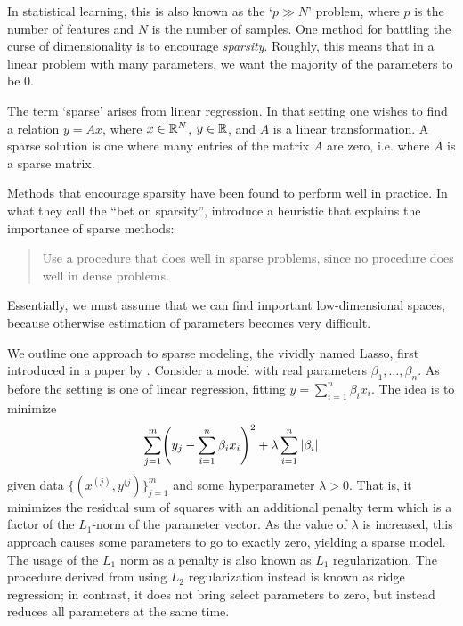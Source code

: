\documentclass[cclicense]{hmcthesis}
\numberwithin{equation}{chapter}
\numberwithin{thmcounter}{chapter}
\begin{document}
    In statistical learning, this is also known as the `$p \gg N$' problem,
    where $p$ is the number of features and $N$ is the number of samples.  One
    method for battling the curse of dimensionality is to encourage
    \emph{sparsity}.  Roughly, this means that in a linear problem with many
    parameters, we want the majority of the parameters to be $0$.  
    
    \begin{example}
        The term `sparse' arises from linear regression.  In that setting one
        wishes to find a relation $y = Ax$, where $x \in \mathbb{R}^N$, $y \in \mathbb{R}$, and
        $A$ is a linear transformation.  A sparse solution is one where many
        entries of the matrix $A$ are zero, i.e. where $A$ is a sparse matrix.
    \end{example}
    
    Methods that encourage sparsity have been found to perform well in practice.
    In what they call the ``bet on sparsity'', \citeauthor{EOSL} introduce a
    heuristic that explains the importance of sparse methods:
    \begin{quote}
        Use a procedure that does well in sparse problems, since no procedure
        does well in dense problems.
    \end{quote}
    \noindent Essentially, we must assume that we can find important
    low-dimensional spaces, because otherwise estimation of parameters becomes
    very difficult.

    We outline one approach to sparse modeling, the vividly named Lasso, first
    introduced in a paper by \citet{LASSO}.  Consider a model with real
    parameters $\beta_1, \ldots, \beta_n$.  As before the setting is one of
    linear regression, fitting $y = \sum_{i=1}^n \beta_i x_i$.  The idea is to
    minimize
    \[
        \sum_{j=1}^m \pdel*{y_j - \sum_{i=1}^n \beta_i x_i}^2 + \lambda \sum_{i=1}^n
        |\beta_i|
    \]
    given data $\{(x^{(j)}, y^{(j})\}_{j=1}^m$ and some hyperparameter $\lambda
    > 0$.  That is, it minimizes the residual sum of squares with an additional
    penalty term which is a factor of the $L_1$-norm of the parameter vector.
    As the value of $\lambda$ is increased, this approach causes some parameters
    to go to exactly zero, yielding a sparse model.  The usage of the $L_1$ norm
    as a penalty is also known as $L_1$ regularization.  The procedure derived
    from using $L_2$ regularization instead is known as ridge regression; in
    contrast, it does not bring select parameters to zero, but instead reduces
    all parameters at the same time.
\end{document}
